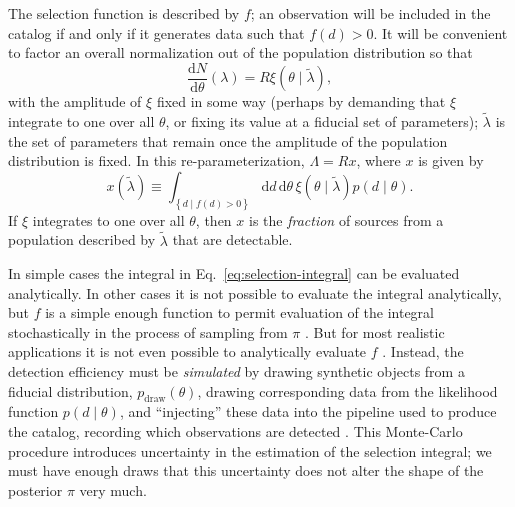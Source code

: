 \documentclass[modern]{aastex62}
\newcommand{\dd}{\mathrm{d}}
\newcommand{\diff}[2]{\frac{\dd #1}{\dd #2}}
\newcommand{\pdraw}{p_\mathrm{draw}}
\begin{document}
%
The selection function is described by $f$; an observation will be included in
the catalog if and only if it generates data such that $f(d) > 0$.  It will be
convenient to factor an overall normalization out of the population distribution
so that
%
\begin{equation}
  \diff{N}{\theta}\left( \lambda \right) = R \xi\left( \theta \mid \tilde{\lambda} \right),
\end{equation}
%
with the amplitude of $\xi$ fixed in some way (perhaps by demanding that $\xi$
integrate to one over all $\theta$, or fixing its value at a fiducial set of
parameters); $\tilde{\lambda}$ is the set of parameters that remain once the
amplitude of the population distribution is fixed.  In this re-parameterization,
$\Lambda = R x$, where $x$ is given by
%
\begin{equation}
  \label{eq:selection-integral}
  x\left( \tilde{\lambda} \right) \equiv \int_{\left\{ d \mid f(d) > 0 \right\}} \dd d \, \dd \theta \, \xi\left( \theta \mid \tilde{\lambda} \right) p\left( d \mid \theta \right).
\end{equation}
%
If $\xi$ integrates to one over all $\theta$, then $x$ is the \emph{fraction} of
sources from a population described by $\tilde{\lambda}$ that are detectable.

In simple cases the integral in Eq.\ \eqref{eq:selection-integral} can be
evaluated analytically.  In other cases it is not possible to evaluate the
integral analytically, but $f$ is a simple enough function to permit evaluation
of the integral stochastically in the process of sampling from $\pi$
\citep{Mandel2018}.  But for most realistic applications it is not even possible
to analytically evaluate $f$ \citep[see
e.g.][]{Burke2015,Christainsen2015,GW150914-Rate,GW150914-Rate-Supplement,Burke2017}.
Instead, the detection efficiency must be \emph{simulated} by drawing synthetic
objects from a fiducial distribution, $\pdraw\left( \theta \right)$, drawing
corresponding data from the likelihood function $p\left( d \mid \theta \right)$,
and ``injecting'' these data into the pipeline used to produce the catalog,
recording which observations are detected \citep{Tiwari2018}.  This Monte-Carlo
procedure introduces uncertainty in the estimation of the selection integral; we
must have enough draws that this uncertainty does not alter the shape of the
posterior $\pi$ very much.
\end{document}
